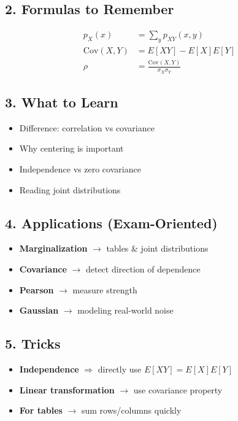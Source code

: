 \documentclass[11pt]{article}
\begin{document}
\subsection*{2. Formulas to Remember}
\begin{align*}
p_X(x) &= \sum_y p_{XY}(x,y) \\
\text{Cov}(X,Y) &= E[XY]-E[X]E[Y] \\
\rho &= \frac{\text{Cov}(X,Y)}{\sigma_X\sigma_Y}
\end{align*}

\subsection*{3. What to Learn}
\begin{itemize}
    \item Difference: correlation vs covariance
    \item Why centering is important
    \item Independence vs zero covariance
    \item Reading joint distributions
\end{itemize}

\subsection*{4. Applications (Exam-Oriented)}
\begin{itemize}
    \item \textbf{Marginalization} $\rightarrow$ tables \& joint distributions
    \item \textbf{Covariance} $\rightarrow$ detect direction of dependence
    \item \textbf{Pearson} $\rightarrow$ measure strength
    \item \textbf{Gaussian} $\rightarrow$ modeling real-world noise
\end{itemize}

\subsection*{5. Tricks}
\begin{itemize}
    \item \textbf{Independence} $\Rightarrow$ directly use $E[XY]=E[X]E[Y]$
    \item \textbf{Linear transformation} $\rightarrow$ use covariance property
    \item \textbf{For tables} $\rightarrow$ sum rows/columns quickly
\end{itemize}
\end{document}
